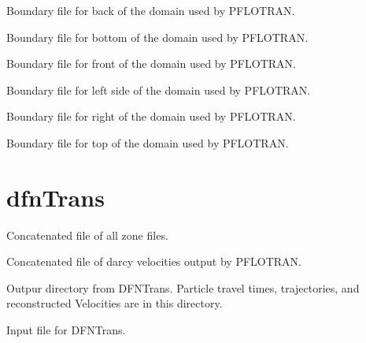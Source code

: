 \documentclass[letterpaper,10pt,english]{sphinxmanual}
\begin{document}

\label{\detokenize{output:pboundary-back-n-ex}}
Boundary file for back of the domain used by PFLOTRAN.


\label{\detokenize{output:pboundary-bottom-ex}}
Boundary file for bottom of the domain used by PFLOTRAN.


\label{\detokenize{output:pboundary-front-s-ex}}
Boundary file for front of the domain used by PFLOTRAN.


\label{\detokenize{output:pboundary-left-w-ex}}
Boundary file for left side of the domain used by PFLOTRAN.


\label{\detokenize{output:pboundary-right-e-ex}}
Boundary file for right of the domain used by PFLOTRAN.


\label{\detokenize{output:pboundary-top-ex}}
Boundary file for top of the domain used by PFLOTRAN.


\section{dfnTrans}
\label{\detokenize{output:dfntrans}}

\label{\detokenize{output:allboundaries-zone}}
Concatenated file of all zone files.


\label{\detokenize{output:darcyvel-dat}}
Concatenated file of darcy velocities output by PFLOTRAN.


\label{\detokenize{output:dfntrans-output-dir}}
Outpur directory from DFNTrans. Particle travel times, trajectories, and reconstructed Velocities are in this directory.


\label{\detokenize{output:ptdfn-control-dat}}
Input file for DFNTrans.
\end{document}
